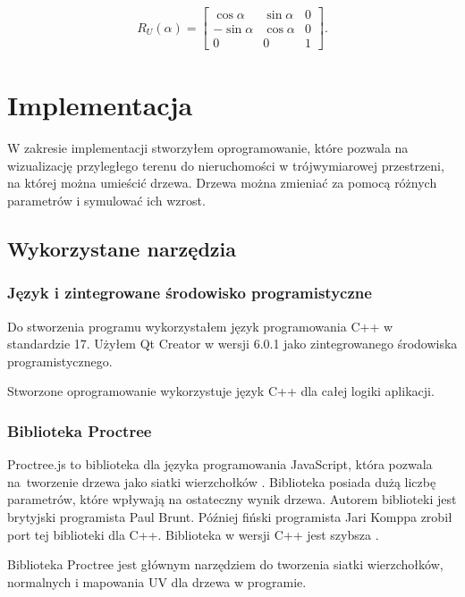 \documentclass[a4paper,twoside,12pt]{report}
\begin{document}
\begin{gather}
	R_{U}(\alpha) =  
	\begin{bmatrix}
		\cos{\alpha} & \sin{\alpha} & 0   \\
		-\sin{\alpha} & \cos{\alpha} &  0 \\
		0 & 0 & 1
	\end{bmatrix}.
\end{gather}



\chapter{Implementacja} 

W zakresie implementacji stworzyłem oprogramowanie, które pozwala na 
wizualizację przyległego terenu do nieruchomości w trójwymiarowej 
przestrzeni, na której można umieścić drzewa. Drzewa można 
zmieniać za pomocą różnych parametrów i symulować ich wzrost.

\section{Wykorzystane narzędzia}

\subsection{Język i zintegrowane środowisko programistyczne}

Do stworzenia programu wykorzystałem język programowania 
C++ w standardzie 17. Użyłem Qt Creator w wersji 6.0.1 jako 
zintegrowanego środowiska programistycznego.

Stworzone oprogramowanie wykorzystuje język C++ dla całej logiki aplikacji.

\subsection{Biblioteka Proctree}

Proctree.js to biblioteka dla języka programowania JavaScript, 
która pozwala na~tworzenie drzewa jako siatki wierzchołków \cite{proctreejs}.
Biblioteka posiada dużą liczbę parametrów, które wpływają na 
ostateczny wynik drzewa. Autorem biblioteki jest brytyjski 
programista Paul Brunt. Później fiński programista Jari Komppa 
zrobił port tej biblioteki dla C++. Biblioteka w wersji C++ jest szybsza \cite{proctree}.

Biblioteka Proctree jest głównym narzędziem do tworzenia siatki wierzchołków,
normalnych i mapowania UV dla drzewa w programie.
\end{document}
